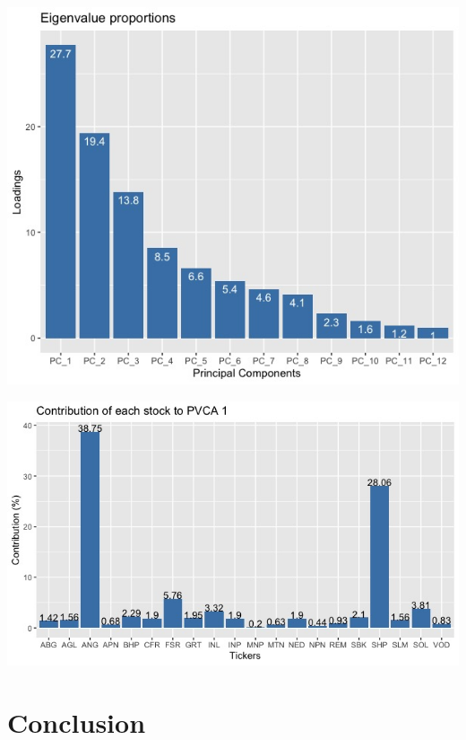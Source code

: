 \documentclass[11pt,preprint, authoryear]{elsarticle}
\let\origfigure\figure
\let\endorigfigure\endfigure
\renewenvironment{figure}[1][2] {
    \expandafter\origfigure\expandafter[H]
} {
    \endorigfigure
}
\numberwithin{equation}{section}
\numberwithin{figure}{section}
\numberwithin{table}{section}
\begin{document}
\begin{figure}[!htb]
\centering
\includegraphics[scale=.45]{figures/Figure_4.jpeg}
\caption{PVCAs proportions explained}\label{Figure_4}
\end{figure}

\begin{figure}[!htb]
\centering
\includegraphics[scale=.45]{figures/Figure_5.jpeg}
\caption{Individual contributions to PVCA 1}\label{Figure_5}
\end{figure}

\hypertarget{conclusion}{%
\section{\texorpdfstring{Conclusion
\label{Conclusion}}{Conclusion }}\label{conclusion}}
\end{document}

